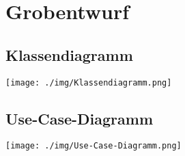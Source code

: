 \chapter{Grobentwurf}

\section{Klassendiagramm}
\begin{minipage}{\linewidth}
\centering%
\texttt{[image: ./img/Klassendiagramm.png]}%
%
\label{fig:Klassendiagramm}%
\end{minipage}
\vspace{10px}





\section{Use-Case-Diagramm}
\begin{minipage}{\linewidth}
\centering%
\texttt{[image: ./img/Use-Case-Diagramm.png]}%
\centering
{}%
\label{fig:Use-Case-Diagramm}%
\end{minipage}
\vspace{10px}
